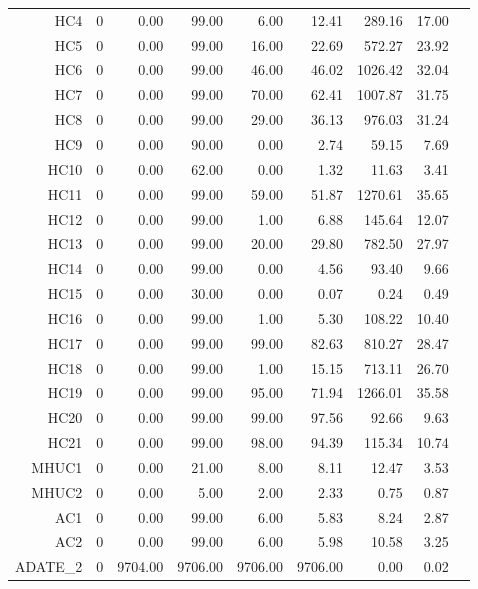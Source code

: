 \begin{longtable}{|rrrrrrrrr|}
	HC4  &  0  &  0.00  &  99.00  &  6.00  &  12.41  &  289.16  &  17.00 & \\
	HC5  &  0  &  0.00  &  99.00  &  16.00  &  22.69  &  572.27  &  23.92 & \\
	HC6  &  0  &  0.00  &  99.00  &  46.00  &  46.02  &  1026.42  &  32.04 & \\
	HC7  &  0  &  0.00  &  99.00  &  70.00  &  62.41  &  1007.87  &  31.75 & \\
	HC8  &  0  &  0.00  &  99.00  &  29.00  &  36.13  &  976.03  &  31.24 & \\
	HC9  &  0  &  0.00  &  90.00  &  0.00  &  2.74  &  59.15  &  7.69 & \\
	HC10  &  0  &  0.00  &  62.00  &  0.00  &  1.32  &  11.63  &  3.41 & \\
	HC11  &  0  &  0.00  &  99.00  &  59.00  &  51.87  &  1270.61  &  35.65 & \\
	HC12  &  0  &  0.00  &  99.00  &  1.00  &  6.88  &  145.64  &  12.07 & \\
	HC13  &  0  &  0.00  &  99.00  &  20.00  &  29.80  &  782.50  &  27.97 & \\
	HC14  &  0  &  0.00  &  99.00  &  0.00  &  4.56  &  93.40  &  9.66 & \\
	HC15  &  0  &  0.00  &  30.00  &  0.00  &  0.07  &  0.24  &  0.49 & \\
	HC16  &  0  &  0.00  &  99.00  &  1.00  &  5.30  &  108.22  &  10.40 & \\
	HC17  &  0  &  0.00  &  99.00  &  99.00  &  82.63  &  810.27  &  28.47 & \\
	HC18  &  0  &  0.00  &  99.00  &  1.00  &  15.15  &  713.11  &  26.70 & \\
	HC19  &  0  &  0.00  &  99.00  &  95.00  &  71.94  &  1266.01  &  35.58 & \\
	HC20  &  0  &  0.00  &  99.00  &  99.00  &  97.56  &  92.66  &  9.63 & \\
	HC21  &  0  &  0.00  &  99.00  &  98.00  &  94.39  &  115.34  &  10.74 & \\
	MHUC1  &  0  &  0.00  &  21.00  &  8.00  &  8.11  &  12.47  &  3.53 & \\
	MHUC2  &  0  &  0.00  &  5.00  &  2.00  &  2.33  &  0.75  &  0.87 & \\
	AC1  &  0  &  0.00  &  99.00  &  6.00  &  5.83  &  8.24  &  2.87 & \\
	AC2  &  0  &  0.00  &  99.00  &  6.00  &  5.98  &  10.58  &  3.25 & \\
	ADATE\_2  &  0  &  9704.00  &  9706.00  &  9706.00  &  9706.00  &  0.00  &  0.02 & \\

\end{longtable}
